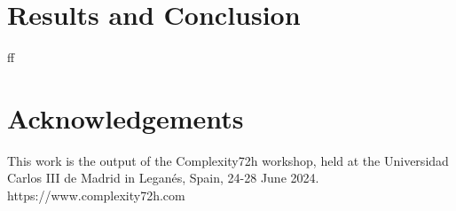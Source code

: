 \documentclass{article}
\begin{document}




\section{Results and Conclusion}
ff








\section{Acknowledgements}
This work is the output of the Complexity72h workshop, held at the Universidad Carlos III de Madrid in Leganés, Spain, 24-28 June 2024. https://www.complexity72h.com


\end{document}
